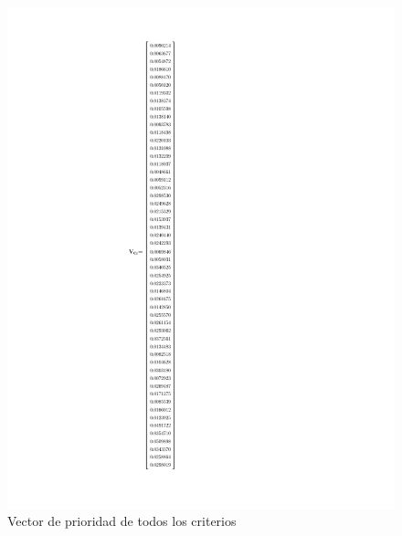 \newpage
\begin{figure}[H]
	\centering
	\includegraphics[width=15cm]{imagenes/VectorDePrioridadEx}
	\caption{Vector de prioridad de todos los criterios}
	\label{fig:VectorDePrioridadEx}
\end{figure}

